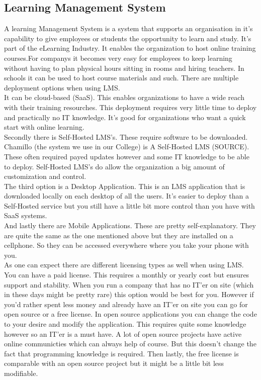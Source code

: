 \subsection{Learning Management System}
A learning Management System is a system that supports an organisation in it's capability to give employees or students the opportunity to learn and study. It's part of the eLearning Industry. It enables the organization to host online training courses.For companys it becomes very easy for employees to keep learning without having to plan physical hours sitting in rooms and hiring teachers. In schools it can be used to host course materials and such. There are multiple deployment options when using LMS. \\
It can be cloud-based (SaaS). This enables organizations to have a wide reach with their training resourches. This deployment requires very little time to deploy and practically no IT knowledge. It's good for organizations who want a quick start with online learning.\\
Secondly there is Self-Hosted LMS's. These require software to be downloaded. Chamillo (the system we use in our College) is A Self-Hosted LMS (SOURCE). These often required payed updates however and some IT knowledge to be able to deploy. Self-Hosted LMS's do allow the organization a big amount of customization and control.\\
The third option is a Desktop Application. This is an LMS application that is downloaded locally on each desktop of all the users. It's easier to deploy than a Self-Hosted service but you still have a little bit more control than you have with SaaS systems.\\
And lastly there are Mobile Applications. These are pretty self-explanatory. They are quite the same as the one mentioned above but they are installed on a cellphone. So they can be accessed everywhere where you take your phone with you.\\
As one can expect there are different licensing types as well when using LMS. You can have a paid license. This requires a monthly or yearly cost but ensures support and stability. When you run a company that has no IT'er on site (which in these days might be pretty rare) this option would be best for you. However if you'd rather spent less money and already have an IT'er on site you can go for open source or a free license. In open source applications you can change the code to your desire and modify the application. This requires quite some knowledge however so an IT'er is a must have. A lot of open source projects have active online communicties which can always help of course. But this doesn't change the fact that programming knowledge is required. Then lastly, the free license is comparable with an open source project but it might be a little bit less modifiable.\\
